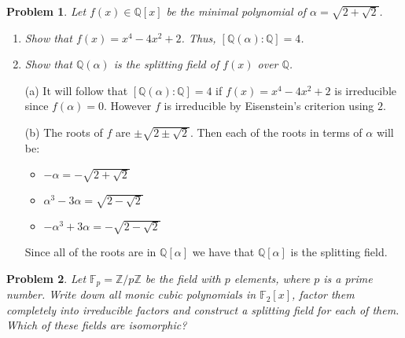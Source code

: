 \documentclass[10pt]{article}
\newcommand{\sk}{\vskip 10mm}
\newcommand{\bb}[1]{\mathbb{#1}}
\theoremstyle{plain}
\newtheorem{problem}{Problem}
\theoremstyle{remark}
\begin{document}
\begin{problem}
  Let $f(x) \in \mathbb{Q}[x]$ be the minimal polynomial of $\alpha = \sqrt{2 + \sqrt{2}}$.
\begin{enumerate}
    \item Show that $f(x) = x^4 - 4x^2 + 2$. Thus, $[\mathbb{Q}(\alpha): \mathbb{Q}] = 4$.
    \item Show that $\mathbb{Q}(\alpha)$ is the splitting field of $f(x)$ over $\mathbb{Q}$.
\end{enumerate}
\end{problem}

\begin{enumerate}
\item[(a)] It will follow that $[\bb{Q}(\alpha):\bb{Q}]=4$ if
  $f(x)=x^4-4x^2+2$ is irreducible since $f(\alpha)=0$. However
  $f$ is irreducible by Eisenstein's criterion using $2$.
\item[(b)] The roots of $f$ are $\pm\sqrt{2\pm\sqrt{2}}$. Then each of the roots
  in terms of $\alpha$ will be:
  \begin{itemize}
  \item $-\alpha=-\sqrt{2+\sqrt{2}}$
  \item $\alpha^3-3\alpha=\sqrt{2-\sqrt{2}}$
  \item $-\alpha^3+3\alpha=-\sqrt{2-\sqrt{2}}$
  \end{itemize}
  Since all of the roots are in $\bb{Q}[\alpha]$ we have that $\bb{Q}[\alpha]$ is the
  splitting field.
\end{enumerate}

\sk

\begin{problem}
  Let $\mathbb{F}_p = \mathbb{Z}/p\mathbb{Z}$ be the field with $p$
  elements, where $p$ is a prime number. Write down all monic cubic
  polynomials in $\mathbb{F}_2[x]$, factor them completely into
  irreducible factors and construct a splitting field for each
  of them. Which of these fields are isomorphic?
\end{problem}
\end{document}
